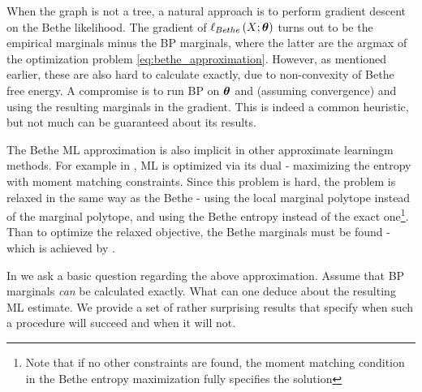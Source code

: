 When the graph is not a tree, a natural approach is to perform gradient descent on the Bethe likelihood.
The gradient of $\ell_{Bethe}\left(X;\boldsymbol{\theta}\right)$ turns out to be the empirical marginals minus the BP marginals, where the  latter are the argmax of the optimization problem  \eqref{eq:bethe_approximation}.
However, as mentioned earlier, these are also hard to calculate exactly, due to non-convexity of Bethe free energy.
A compromise is to run BP on $\boldsymbol{\theta}$ and (assuming convergence) and using the resulting marginals in the gradient.
This is indeed a common heuristic, but not much can be guaranteed about its results.

The Bethe ML approximation is also implicit in other approximate learningm methods.
For example in \cite{ganapathi2012constrained}, ML is optimized via its dual - maximizing the entropy with moment matching constraints.
Since this problem is hard, the problem is relaxed in the same way as the Bethe - using the local marginal polytope instead of the marginal polytope, and using the Bethe entropy instead of the exact one\footnote{Note that if no other constraints are found, the moment matching condition in the Bethe entropy maximization fully specifies the solution}.
Than to optimize the relaxed objective, the Bethe marginals must be found - which is achieved by \cite{yuille2002cccp}.

In \cite{heinemann2012cannot} we ask a basic question regarding the above approximation. Assume that BP marginals {\em can} be calculated exactly. What can one deduce about the resulting ML estimate. We provide a set of rather surprising results that specify when such a procedure will succeed and when it will not.

